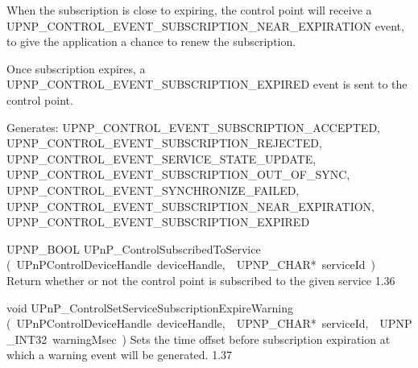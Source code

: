 \documentclass{article}
\begin{document}
\begin{cxxentry}
\begin{cxxfunction}
\begin{cxxdoc}
When the subscription is close to expiring, the control point will
receive a UPNP\_CONTROL\_EVENT\_SUBSCRIPTION\_NEAR\_EXPIRATION event, to
give the application a chance to renew the subscription.

Once subscription expires, a UPNP\_CONTROL\_EVENT\_SUBSCRIPTION\_EXPIRED
event is sent to the control point.

Generates:
UPNP\_CONTROL\_EVENT\_SUBSCRIPTION\_ACCEPTED,
UPNP\_CONTROL\_EVENT\_SUBSCRIPTION\_REJECTED,
UPNP\_CONTROL\_EVENT\_SERVICE\_STATE\_UPDATE,
UPNP\_CONTROL\_EVENT\_SUBSCRIPTION\_OUT\_OF\_SYNC,
UPNP\_CONTROL\_EVENT\_SYNCHRONIZE\_FAILED,
UPNP\_CONTROL\_EVENT\_SUBSCRIPTION\_NEAR\_EXPIRATION,
UPNP\_CONTROL\_EVENT\_SUBSCRIPTION\_EXPIRED


\end{cxxdoc}
\end{cxxfunction}
\begin{cxxfunction}
{UPNP\_BOOL}
        {UPnP\_ControlSubscribedToService}
        {(\ UPnPControlDeviceHandle\ deviceHandle,\ \ UPNP\_CHAR*\ serviceId\ )}
        {Return whether or not the control point is subscribed to the given service }
        {1.36}
\begin{cxxdoc}


\end{cxxdoc}
\end{cxxfunction}
\begin{cxxfunction}
{void}
        {UPnP\_ControlSetServiceSubscriptionExpireWarning}
        {(\ UPnPControlDeviceHandle\ deviceHandle,\ \ UPNP\_CHAR*\ serviceId,\ \ UPNP\_INT32\ warningMsec\ )}
        {Sets the time offset before subscription expiration at which a warning event will be generated. }
        {1.37}
\begin{cxxdoc}


\end{cxxdoc}
\end{cxxfunction}
\end{cxxentry}
\end{document}
